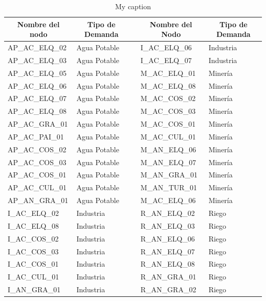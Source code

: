 \documentclass[11pt,]{article}
\begin{document}
\begin{table}[H]
\centering
\caption{My caption}
\label{tabla7}
\begin{tabular}{@{}lllll@{}}
\toprule
\multicolumn{1}{c}{\textbf{Nombre del nodo}} & \multicolumn{1}{c}{\textbf{Tipo de Demanda}} &  & \multicolumn{1}{c}{\textbf{Nombre del Nodo}} & \multicolumn{1}{c}{\textbf{Tipo de Demanda}} \\ \midrule
AP\_AC\_ELQ\_02 & Agua Potable &  & I\_AC\_ELQ\_06 & Industria \\
AP\_AC\_ELQ\_03 & Agua Potable &  & I\_AC\_ELQ\_07 & Industria \\
AP\_AC\_ELQ\_05 & Agua Potable &  & M\_AC\_ELQ\_01 & Minería \\
AP\_AC\_ELQ\_06 & Agua Potable &  & M\_AC\_ELQ\_08 & Minería \\
AP\_AC\_ELQ\_07 & Agua Potable &  & M\_AC\_COS\_02 & Minería \\
AP\_AC\_ELQ\_08 & Agua Potable &  & M\_AC\_COS\_03 & Minería \\
AP\_AC\_GRA\_01 & Agua Potable &  & M\_AC\_COS\_01 & Minería \\
AP\_AC\_PAI\_01 & Agua Potable &  & M\_AC\_CUL\_01 & Minería \\
AP\_AC\_COS\_02 & Agua Potable &  & M\_AN\_ELQ\_06 & Minería \\
AP\_AC\_COS\_03 & Agua Potable &  & M\_AN\_ELQ\_07 & Minería \\
AP\_AC\_COS\_01 & Agua Potable &  & M\_AN\_GRA\_01 & Minería \\
AP\_AC\_CUL\_01 & Agua Potable &  & M\_AN\_TUR\_01 & Minería \\
AP\_AN\_GRA\_01 & Agua Potable &  & M\_AC\_ELQ\_06 & Minería \\
I\_AC\_ELQ\_02 & Industria &  & R\_AN\_ELQ\_02 & Riego \\
I\_AC\_ELQ\_08 & Industria &  & R\_AN\_ELQ\_03 & Riego \\
I\_AC\_COS\_02 & Industria &  & R\_AN\_ELQ\_06 & Riego \\
I\_AC\_COS\_03 & Industria &  & R\_AN\_ELQ\_07 & Riego \\
I\_AC\_COS\_01 & Industria &  & R\_AN\_ELQ\_08 & Riego \\
I\_AC\_CUL\_01 & Industria &  & R\_AN\_GRA\_01 & Riego \\
I\_AN\_GRA\_01 & Industria &  & R\_AN\_GRA\_02 & Riego \\ \bottomrule
\end{tabular}
\end{table}
\end{document}
